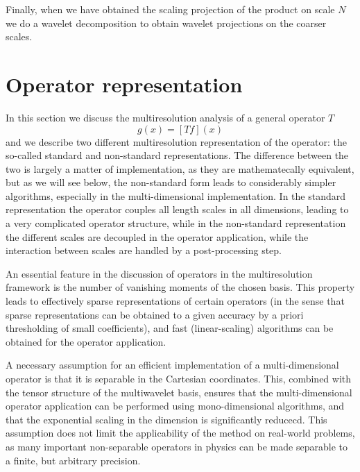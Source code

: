 Finally, when we have obtained the scaling projection of the product on scale
$N$ we do a wavelet decomposition to obtain wavelet projections on 
the coarser scales. 

\section{Operator representation}
In this section we discuss the multiresolution analysis of a general operator $T$
\begin{equation}
    g(x) = [Tf](x)
\end{equation}
and we describe two different multiresolution representation of the operator: the 
so-called standard and non-standard representations. The difference between 
the two is largely a matter of implementation, as they are mathematecally equivalent,
but as we will see below, the non-standard form leads to considerably simpler algorithms, 
especially in the multi-dimensional implementation. In the standard representation the
operator couples all length scales in all dimensions, leading to a very complicated
operator structure, while in the non-standard representation the different scales are 
decoupled in the operator application, while the interaction between scales are handled 
by a post-processing step.

An essential feature in the discussion of operators in the multiresolution framework
is the number of vanishing moments of the chosen basis. This property leads to 
effectively sparse representations of certain operators (in the sense that sparse
representations can be obtained to a given accuracy by a priori thresholding of small 
coefficients), and fast (linear-scaling) algorithms can be obtained for the operator 
application.

A necessary assumption for an efficient implementation of a multi-dimensional operator
is that it is separable in the Cartesian coordinates. This, combined with the tensor
structure of the multiwavelet basis, ensures that the multi-dimensional operator 
application can be performed using mono-dimensional algorithms, and that the exponential
scaling in the dimension is significantly reducecd. This assumption does not
limit the applicability of the method on real-world problems, as many important 
non-separable operators in physics can be made separable to a finite, but arbitrary
precision.

